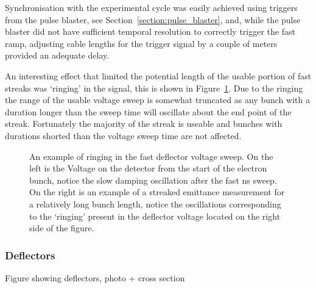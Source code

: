 Synchronisation with the experimental cycle was easily achieved using triggers from the pulse blaster, see Section~\ref{section:pulse_blaster}, and, while the pulse blaster did not have sufficient temporal resolution to correctly trigger the fast ramp, adjusting cable lengths for the trigger signal by a couple of meters provided an adequate delay.

An interesting effect that limited the potential length of the usable portion of fast streaks was `ringing' in the signal, this is shown in Figure~\ref{figure:ringing}.
Due to the ringing the range of the usable voltage sweep is somewhat truncated as any bunch with a duration longer than the sweep time will oscillate about the end point of the streak.
Fortunately the majority of the streak is useable and bunches with durations shorted than the voltage sweep time are not affected.

\begin{figure}
    \center
    
    \caption{An example of ringing in the fast deflector voltage sweep. On the left is the Voltage on the detector from the start of the electron bunch, notice the slow damping oscillation after the fast \unit[10]{ns} sweep. On the right is an example of a streaked emittance measurement for a relatively long bunch length, notice the oscillations corresponding to the `ringing' present in the deflector voltage located on the right side of the figure.}
    \label{figure:ringing}
\end{figure}

\subsubsection{Deflectors}

{\color{red}Figure showing deflectors, photo + cross section}


